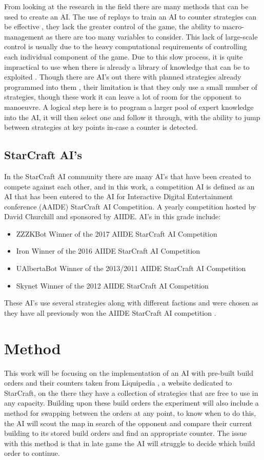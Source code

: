 \documentclass[journal]{IEEEtran}
\begin{document}
From looking at the research in the field there are many methods that can be used to create an AI. The use of replays to train an AI to counter strategies can be effective \cite{Bayesian}, they lack the greater control of the game, the ability to macro-management as there are too many variables to consider. This lack of large-scale control is usually due to the heavy computational requirements of controlling each individual component of the game.  Due to this slow process, it is quite impractical to use when there is already a library of knowledge that can be to exploited \cite{Liquid}. Though there are AI's out there with planned strategies already programmed into them \cite{ZZZK}\cite{Fuzzy}, their limitation is that they only use a small number of strategies, though these work it can leave a lot of room for the opponent to manoeuvre. A logical step here is to program a larger pool of expert knowledge into the AI, it will then select one and follow it through, with the ability to jump between strategies at key points in-case a counter is detected. 

\subsection{StarCraft AI's}
In the StarCraft AI community there are many AI's that have been created to compete against each other, and in this work, a competition AI is defined as an AI that has been entered to the AI for Interactive Digital Entertainment conference (AAIDE) StarCraft AI Competition. A yearly competition hosted by David Churchill and sponsored by AIIDE. AI's in this grade include:
\begin{itemize}
\item ZZZKBot Winner of the 2017 AIIDE StarCraft AI Competition \cite{ZZZK}
\item Iron Winner of the 2016 AIIDE StarCraft AI Competition \cite{Iron}
\item UAlbertaBot Winner of the 2013/2011 AIIDE StarCraft AI Competition \cite{UAlberta}
\item Skynet Winner of the 2012 AIIDE StarCraft AI Competition \cite{Skynet}
\end{itemize}

These AI's use several strategies along with different factions and were chosen as they have all previously won the AIIDE StarCraft AI competition \cite{Results}.

\section{Method}
This work will be focusing on the implementation of an AI with pre-built build orders and their counters taken from Liquipedia \cite{Liquid}, a website dedicated to StarCraft, on the there they have a collection of strategies that are free to use in any capacity. Building upon these build orders the experiment will also include a method for swapping between the orders at any point, to know when to do this, the AI will scout the map in search of the opponent and compare their current building to its stored build orders and find an appropriate counter. The issue with this method is that in late game the AI will struggle to decide which build order to continue. 
\end{document}
